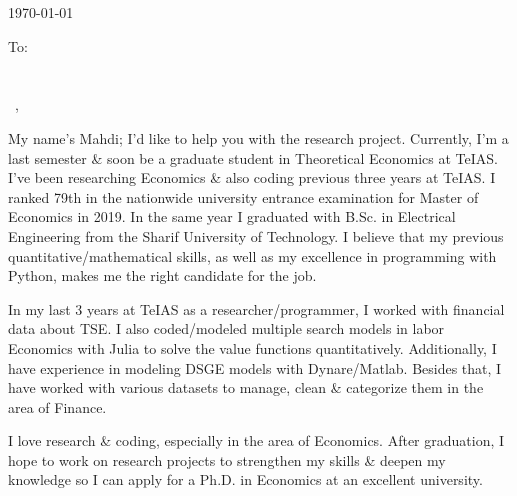 \documentclass[12pt]{letter}
\begin{document}
\AddToShipoutPictureBG{%
\color{gr}
\AtPageUpperLeft{\rule[-1.3in]{\paperwidth}{1.3in}}
}

\begin{center}
{\fontsize{28}{0}\selectfont\scshape \myname}

\href{mailto:\myemail}{\faEnvelope\enspace \myemail}\hfill
\href{tel:\myphone}{\faPhone\enspace \myphone}\hfill
\faMapMarker\enspace \mylocation
\end{center}

\vspace{0.2in}

\today\\

\vspace{-0.1in} 

\color{gray} To:\\
\color{black}
\recipient\\
\company\\


\vspace{-0.1in}\greeting\ \recipient,\\

\vspace{-0.1in}\setlength\parindent{24pt}

My name's Mahdi; I'd like to help you with the research project. 
Currently, I'm a last semester \& soon be a graduate student in 
Theoretical Economics at TeIAS. I've been researching Economics \& 
also coding previous three years at TeIAS. 
I ranked 79th in the nationwide university entrance examination 
for Master of Economics in 2019. In the same year
I graduated with B.Sc. in Electrical Engineering from 
the Sharif University of Technology. 
I believe that my previous quantitative/mathematical skills, 
as well as my excellence in programming with Python, 
makes me the right candidate for the job.

In my last 3 years at TeIAS as a researcher/programmer, 
I worked with financial data about TSE. 
I also coded/modeled multiple search models in labor Economics 
with Julia to solve the value functions quantitatively. 
Additionally, I have experience in modeling DSGE models with Dynare/Matlab. 
Besides that, I have worked with various datasets
to manage, clean \& categorize them in the area of Finance.

I love research \& coding, especially in the area of Economics.
After graduation, I hope to work on research projects to strengthen 
my skills \& deepen my knowledge so I can apply for a Ph.D. in Economics 
at an excellent university.
\end{document}
